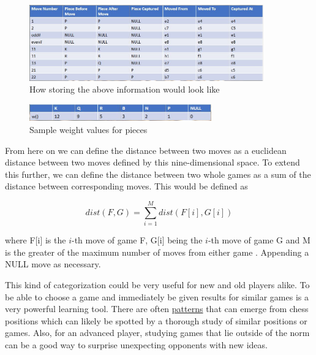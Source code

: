 \documentclass[12pt]{article}
\begin{document}
    
        \begin{figure}[ht]
            \centering
            \caption{How storing the above information would look like}
            \label{fig:storing9d}
            \includegraphics[width=0.9\textwidth]{9dboard.jpg}
        \end{figure}
        \begin{figure}[ht]
            \centering
            \caption{Sample weight values for pieces}
            \label{fig:piece_weights}
            \includegraphics[width=0.7\textwidth]{sampleweights.jpg}
        \end{figure}

    From here on we can define the distance between two moves as a euclidean distance between two moves defined by this nine-dimensional space. To extend this further, we can define the distance between two whole games as a sum of the distance between corresponding moves. This would be defined as 

    \begin{equation}
        dist(F, G) = \sum^{M}_{i=1} dist(F[i], G[i])
    \end{equation}

    where F[i] is the $i$-th move of game F, G[i] being the $i$-th move of game G and M is the greater of the maximum number of moves from either game \cite{main}. Appending a NULL move as necessary.

    This kind of categorization could be very useful for new and old players alike. To be able to choose a game and immediately be given results for similar games is a very powerful learning tool. There are often \href{https://www.chessstrategyonline.com/content/tutorials/basic-checkmates-smothered-mate}{patterns} that can emerge from chess positions which can likely be spotted by a thorough study of similar positions or games. Also, for an advanced player, studying games that lie outside of the norm can be a good way to surprise unexpecting opponents with new ideas.
\end{document}
